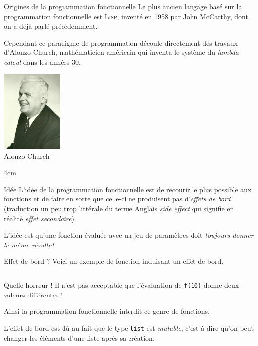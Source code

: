 \documentclass[10pt]{beamer}
\begin{document}
\begin{frame}{Origines de la programmation fonctionnelle}
Le plus ancien langage basé sur la programmation fonctionnelle est \textsc{Lisp}, inventé en 1958 par John McCarthy, dont on a déjà parlé précédemment.\\\pause	

Cependant ce paradigme de programmation découle directement des travaux d'Alonzo Church, mathématicien américain qui inventa le système du \textit{lambda-calcul} dans les années 30.\pause

{\begin{center}
		\includegraphics[width=3cm]{img/church}\\ \footnotesize Alonzo Church
\end{center}}{4cm}
\end{frame}

\begin{frame}{Idée}
L'idée de la programmation fonctionnelle est de recourir le plus possible aux fonctions et de faire en sorte que celle-ci ne produisent pas d'\textit{effets de bord} (traduction un peu trop littérale du terme Anglais \textit{side effect} qui signifie en réalité \textit{effet secondaire}).\\\pause

L'idée est qu'une fonction évaluée avec un jeu de paramètres doit \textit{toujours donner le même résultat.}
\end{frame}
\begin{frame}[fragile]{Effet de bord ?}
Voici un exemple de fonction induisant un effet de bord.
\inputminted{python}{scripts/func7.py}	
\end{frame}
\begin{frame}[fragile]{Quelle horreur !}
Il n'est pas acceptable que l'évaluation de \texttt{f(10)} donne deux valeurs différentes !\\\pause

Ainsi la programmation fonctionnelle interdit ce genre de fonctions.\\\pause 

L'effet de bord est dû au fait que le type \texttt{list} est \textit{mutable}, c'est-à-dire qu'on peut changer les éléments d'une liste après sa création.\\
\end{frame}
\end{document}
